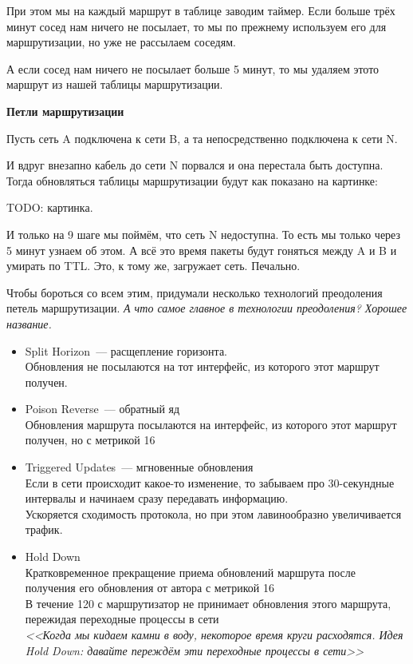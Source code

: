 При этом мы на каждый маршрут в таблице заводим таймер. Если больше трёх минут сосед нам ничего не посылает, то мы по прежнему используем его для маршрутизации, но уже не рассылаем соседям.

А если сосед нам ничего не посылает больше 5 минут, то мы удаляем этото маршрут из нашей таблицы маршрутизации.

{\bf Петли маршрутизации}

Пусть сеть A подключена к сети B, а та непосредственно подключена к сети N.

И вдруг внезапно кабель до сети N порвался и она перестала быть доступна. Тогда обновляться таблицы маршрутизации будут как показано на картинке:

TODO: картинка.

И только на 9 шаге мы поймём, что сеть N недоступна. То есть мы только через 5 минут узнаем об этом. А всё это время пакеты будут гоняться между A и B и умирать по TTL. Это, к тому же, загружает сеть. Печально.

Чтобы бороться со всем этим, придумали несколько технологий преодоления петель маршрутизации. {\it А что самое главное в технологии преодоления? Хорошее название.}
\begin{itemize}
    \item Split Horizon~--- расщепление горизонта.\\
    Обновления не посылаются на тот интерфейс, из которого этот маршрут получен. 
    \item Poison Reverse~--- обратный яд\\
    Обновления маршрута посылаются на интерфейс, из которого этот маршрут получен, но с метрикой 16
    \item Triggered Updates~--- мгновенные обновления\\
    Если в сети происходит какое-то изменение, то забываем про 30-секундные интервалы и начинаем сразу передавать информацию.\\
    Ускоряется сходимость протокола, но при этом лавинообразно увеличивается трафик.
    \item Hold Down\\
    Кратковременное прекращение приема обновлений маршрута после получения его обновления от автора с метрикой 16\\
    В течение 120 с маршрутизатор не принимает обновления этого маршрута, пережидая переходные процессы в сети\\
    {\it <<Когда мы кидаем камни в воду, некоторое время круги расходятся. Идея Hold Down: давайте переждём эти переходные процессы в сети>>}
\end{itemize}

